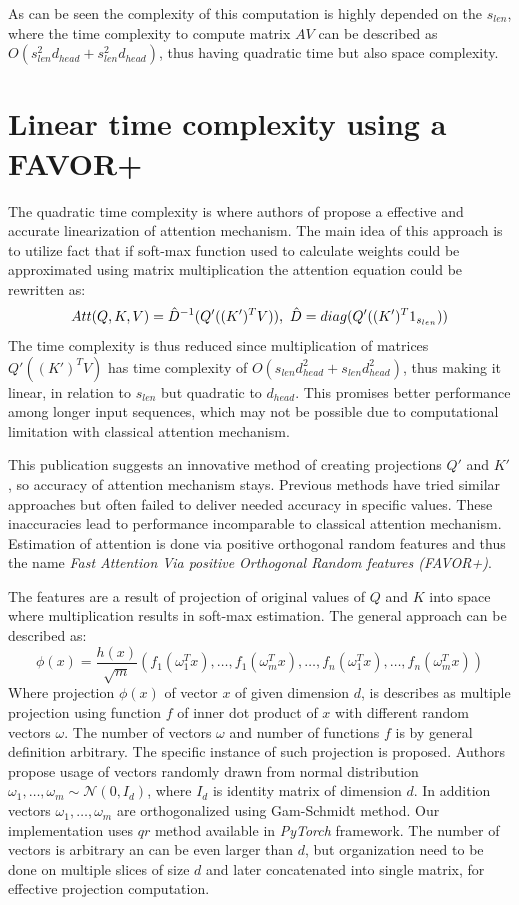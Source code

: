 As can be seen the complexity of this computation is highly depended on the $s_{len}$, where the time complexity to compute matrix $AV$ can be described as $O(s_{len}^2 d_{head} + s_{len}^2 d_{head})$, thus having quadratic time but also space complexity.
\section{Linear time complexity using a FAVOR+}
\label{sec:performer}
The quadratic time complexity is where authors of \cite{DBLP:performer} propose a effective and accurate linearization of attention mechanism. The main idea of this approach is to utilize fact that if soft-max function used to calculate weights could be approximated using matrix multiplication the attention equation could be rewritten as:
\begin{equation}
    Att(Q,K,V) = \Hat{D}^{-1} (Q'((K')^T V)),\ 
    \Hat{D} = diag(Q'((K')^T 1_{s_{len}}))
\end{equation}
The time complexity is thus reduced since multiplication of matrices $Q'((K')^T V)$ has time complexity of $O(s_{len} d_{head}^2 + s_{len} d_{head}^2)$, thus making it linear, in relation to $s_{len}$ but quadratic to $d_{head}$. This promises better performance among longer input sequences, which may not be possible due to computational limitation with classical attention mechanism.

This publication suggests an innovative method of creating projections $Q'$ and $K'$, so accuracy of attention mechanism stays. Previous methods have tried similar approaches but often failed to deliver needed accuracy in specific values. These inaccuracies lead to performance incomparable to classical attention mechanism. Estimation of attention is done via positive orthogonal random features and thus the name \textit{Fast Attention Via positive Orthogonal Random features (FAVOR+)}. 

The features are a result of projection of original values of $Q$ and $K$ into space where multiplication results in soft-max estimation. The general approach can be described as:
\begin{equation}
    \phi(x) = \frac{h(x)}{\sqrt{m}} (f_1(\omega_1^T x), \dots ,f_1(\omega_m^T x), \dots ,f_n(\omega_1^T x),\dots,f_n(\omega_m^T x) )
\end{equation}
Where projection $\phi(x)$ of vector $x$ of given dimension $d$, is describes as multiple projection using function $f$ of inner dot product of $x$ with different random vectors $\omega$. The number of vectors $\omega$ and number of functions $f$ is by general definition arbitrary. The specific instance of such projection is proposed. Authors propose usage of vectors randomly drawn from normal distribution $\omega_1,\dots,\omega_m \sim \mathcal{N}(0,I_d)$, where $I_d$ is identity matrix of dimension $d$. In addition vectors $\omega_1,\dots,\omega_m$ are orthogonalized using Gam-Schmidt method. Our implementation uses $qr$ method available in \textit{PyTorch} framework. The number of vectors is arbitrary an can be even larger than $d$, but organization need to be done on multiple slices of size $d$ and later concatenated into single matrix, for effective projection computation.

